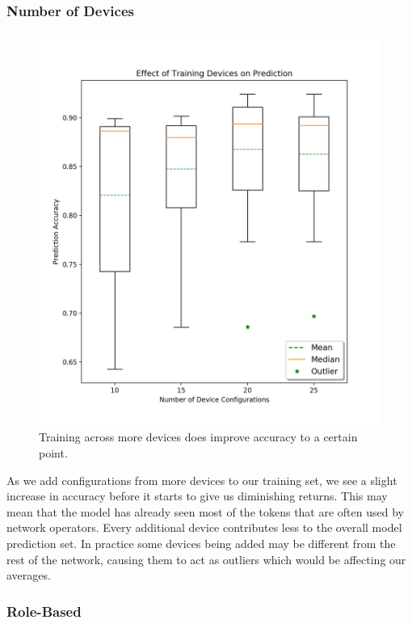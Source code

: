 \subsubsection{Number of Devices}
\begin{figure}[H]
	\centering
	\includegraphics[width=\textwidth]{device_analysis.png}
	\caption{Training across more devices does improve accuracy to a certain point.}
\end{figure}

As we add configurations from more devices to our training set, we see a slight increase in accuracy before it starts to give us diminishing returns. This may mean that the model has already seen most of the tokens that are often used by network operators. Every additional device contributes less to the overall model prediction set. In practice some devices being added may be different from the rest of the network, causing them to act as outliers which would be affecting our averages.

\subsubsection{Role-Based}

